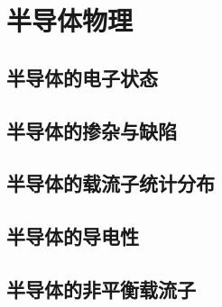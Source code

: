 \part{半导体物理}
\chapter{半导体的电子状态}
\chapter{半导体的掺杂与缺陷}
\chapter{半导体的载流子统计分布}
\chapter{半导体的导电性}
\chapter{半导体的非平衡载流子}